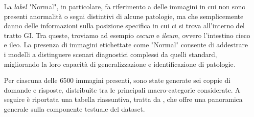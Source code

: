 \documentclass[../main.tex]{subfiles}
\begin{document}
La \textit{label} "Normal", in particolare, fa riferimento a delle immagini in cui non sono presenti anormalità o segni distintivi di alcune patologie, ma che semplicemente danno delle informazioni sulla posizione specifica in cui ci si trova all'interno del tratto GI. Tra queste, troviamo ad esempio \textit{cecum} e \textit{ileum}, ovvero l'intestino cieco e ileo. 
La presenza di immagini etichettate come "Normal" consente di addestrare i modelli a distinguere scenari diagnostici complessi da quelli standard, migliorando la loro capacità di generalizzazione e identificazione di patologie.

Per ciascuna delle 6500 immagini presenti, sono state generate sei coppie di domande e risposte, distribuite tra le principali macro-categorie considerate. 
A seguire è riportata una tabella riassuntiva, tratta da \cite{gautam2024kvasirvqa}, che offre una panoramica generale sulla componente testuale del dataset.
\end{document}
